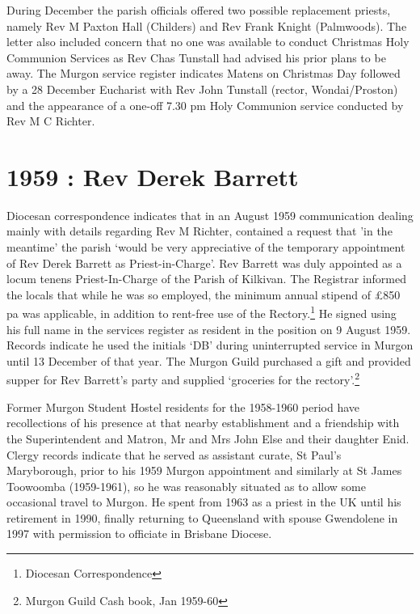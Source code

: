 During December the parish officials offered two possible replacement priests, namely Rev M Paxton Hall (Childers) and Rev Frank Knight (Palmwoods). The letter also included concern that no one was available to conduct Christmas Holy Communion Services as Rev Chas Tunstall had advised his prior plans to be away. The Murgon service register indicates Matens on Christmas Day followed by a 28 December Eucharist with Rev John Tunstall (rector, Wondai/Proston) and the appearance of a one-off 7.30 pm Holy Communion service conducted by Rev M C Richter.



\section{1959 : Rev Derek Barrett}



Diocesan correspondence indicates that in an August 1959 communication dealing mainly with details regarding Rev M Richter, contained a request that 'in the meantime' the parish `would be very appreciative of the temporary appointment of Rev Derek Barrett as Priest-in-Charge'. Rev Barrett was duly appointed as a locum tenens Priest-In-Charge of the Parish of Kilkivan. The Registrar informed the locals that while he was so employed, the minimum annual stipend of \pounds850 pa was applicable, in addition to rent-free use of the Rectory.\footnote{Diocesan Correspondence} He signed using his full name in the services register as resident in the position on 9 August 1959. Records indicate he used the initials `DB' during uninterrupted service in Murgon until 13 December of that year. The Murgon Guild purchased a gift and provided supper for Rev Barrett's party and supplied `groceries for the rectory'.\footnote{Murgon Guild Cash book, Jan 1959-60}


Former Murgon Student Hostel residents for the 1958-1960 period have recollections of his presence at that nearby establishment and a friendship with the Superintendent and Matron, Mr and Mrs John Else and their daughter Enid. Clergy records indicate that he served as assistant curate, St Paul's Maryborough, prior to his 1959 Murgon appointment and similarly at St James Toowoomba (1959-1961), so he was reasonably situated as to allow some occasional travel to Murgon. He spent from 1963 as a priest in the UK until his retirement in 1990, finally returning to Queensland with spouse Gwendolene in 1997 with permission to officiate in Brisbane Diocese.



